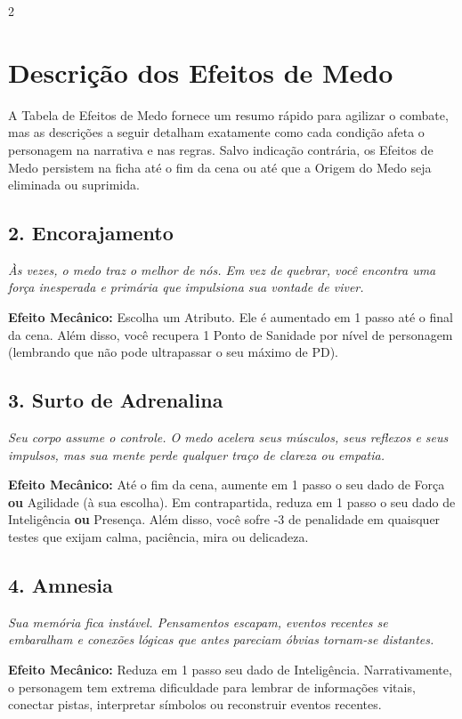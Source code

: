 \documentclass[a4paper,11pt,openany]{book}
\begin{document}
\begin{multicols}{2}
\section{Descrição dos Efeitos de Medo}

A Tabela de Efeitos de Medo fornece um resumo rápido para agilizar o combate, mas as descrições a seguir detalham exatamente como cada condição afeta o personagem na narrativa e nas regras. Salvo indicação contrária, os Efeitos de Medo persistem na ficha até o fim da cena ou até que a Origem do Medo seja eliminada ou suprimida.

\subsection*{2. Encorajamento}
\textit{Às vezes, o medo traz o melhor de nós. Em vez de quebrar, você encontra uma força inesperada e primária que impulsiona sua vontade de viver.}

\textbf{Efeito Mecânico:} Escolha um Atributo. Ele é aumentado em 1 passo até o final da cena. Além disso, você recupera 1 Ponto de Sanidade por nível de personagem (lembrando que não pode ultrapassar o seu máximo de PD).

\subsection*{3. Surto de Adrenalina}
\textit{Seu corpo assume o controle. O medo acelera seus músculos, seus reflexos e seus impulsos, mas sua mente perde qualquer traço de clareza ou empatia.}

\textbf{Efeito Mecânico:} Até o fim da cena, aumente em 1 passo o seu dado de Força \textbf{ou} Agilidade (à sua escolha). Em contrapartida, reduza em 1 passo o seu dado de Inteligência \textbf{ou} Presença. Além disso, você sofre -3 de penalidade em quaisquer testes que exijam calma, paciência, mira ou delicadeza.

\subsection*{4. Amnesia}
\textit{Sua memória fica instável. Pensamentos escapam, eventos recentes se embaralham e conexões lógicas que antes pareciam óbvias tornam-se distantes.}

\textbf{Efeito Mecânico:} Reduza em 1 passo seu dado de Inteligência. Narrativamente, o personagem tem extrema dificuldade para lembrar de informações vitais, conectar pistas, interpretar símbolos ou reconstruir eventos recentes.


\end{multicols}
\end{document}
